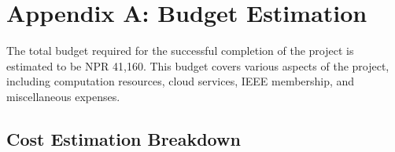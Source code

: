 


\section*{Appendix A: Budget Estimation}
The total budget required for the successful completion of the project is estimated to be NPR 41,160. This budget covers various aspects of the project, including computation resources, cloud services, IEEE membership, and miscellaneous expenses.

\subsection*{Cost Estimation Breakdown}


